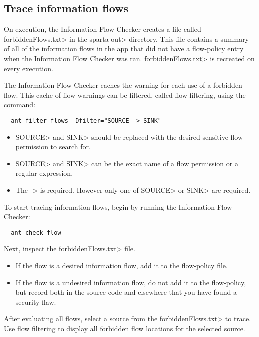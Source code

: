 \subsection{Trace information flows\label{sec:trace-types}}

On execution, the Information Flow Checker creates a file called \<forbiddenFlows.txt> in the 
\<sparta-out>  directory. This file contains a summary of all of the information flows
in the app that did not have a flow-policy entry when the Information Flow Checker was ran.
\<forbiddenFlows.txt> is recreated on every execution.

The Information Flow Checker caches the warning for each use of a forbidden flow.
This cache of flow warnings can be filtered, called flow-filtering, using the command:

\begin{Verbatim}
  ant filter-flows -Dfilter="SOURCE -> SINK"
\end{Verbatim}

\begin{itemize}

\item \<SOURCE> and \<SINK> should be replaced with the desired sensitive flow
permission to search for.

\item \<SOURCE> and \<SINK> can be the exact name of a flow permission or a regular
expression.

\item The -> is required. However only one of \<SOURCE> or \<SINK> are required.
\end{itemize}

To start tracing information flows, begin by running the Information Flow Checker:

\begin{Verbatim}
  ant check-flow
\end{Verbatim}

Next, inspect the \<forbiddenFlows.txt> file. 

\begin{itemize}
\item
If the flow is a desired information flow, add it to the flow-policy file.
\item
If the flow is a undesired information flow, do not add it to the flow-policy,
but record both in the source code and elsewhere that you have found a security flaw.
\end{itemize}

After evaluating all flows, select a source from the \<forbiddenFlows.txt> to trace.
Use flow filtering to display
all forbidden flow locations for the selected source.

